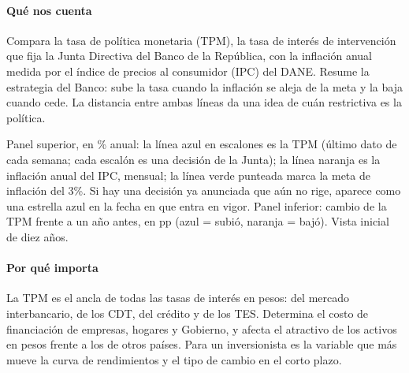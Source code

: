 \paragraph{Qué nos cuenta}
Compara la tasa de política monetaria (TPM), la tasa de interés de intervención que fija la Junta Directiva del Banco de la República, con la inflación anual medida por el índice de precios al consumidor (IPC) del DANE. Resume la estrategia del Banco: sube la tasa cuando la inflación se aleja de la meta y la baja cuando cede. La distancia entre ambas líneas da una idea de cuán restrictiva es la política.

\begin{leer}
Panel superior, en \% anual: la línea azul en escalones es la TPM (último dato de cada semana; cada escalón es una decisión de la Junta); la línea naranja es la inflación anual del IPC, mensual; la línea verde punteada marca la meta de inflación del 3\%. Si hay una decisión ya anunciada que aún no rige, aparece como una estrella azul en la fecha en que entra en vigor. Panel inferior: cambio de la TPM frente a un año antes, en pp (azul = subió, naranja = bajó). Vista inicial de diez años.
\end{leer}

\paragraph{Por qué importa}
La TPM es el ancla de todas las tasas de interés en pesos: del mercado interbancario, de los CDT, del crédito y de los TES. Determina el costo de financiación de empresas, hogares y Gobierno, y afecta el atractivo de los activos en pesos frente a los de otros países. Para un inversionista es la variable que más mueve la curva de rendimientos y el tipo de cambio en el corto plazo.

